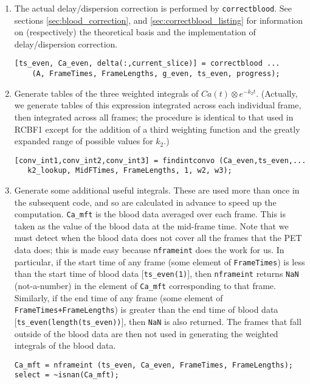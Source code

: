\documentclass[12pt]{article}
\def\code#1{{\tt #1}}
\begin{document}
\begin{enumerate}
\item The actual delay/dispersion correction is performed by
  \code{correctblood}.  See sections \ref{sec:blood_correction}, and
  \ref{sec:correctblood_listing} for information on (respectively) the
  theoretical basis and the implementation of delay/dispersion
  correction.
  \begin{verbatim}
[ts_even, Ca_even, delta(:,current_slice)] = correctblood ...
    (A, FrameTimes, FrameLengths, g_even, ts_even, progress);
  \end{verbatim}

\item Generate tables of the three weighted integrals of $Ca(t)
  \otimes e^{-k_{2}t}$.  (Actually, we generate tables of this
  expression integrated across each individual frame, then integrated
  across all frames; the procedure is identical to that used in RCBF1
  except for the addition of a third weighting function and the
  greatly expanded range of possible values for $k_2$.)
  \begin{verbatim}
[conv_int1,conv_int2,conv_int3] = findintconvo (Ca_even,ts_even,...
   k2_lookup, MidFTimes, FrameLengths, 1, w2, w3);
  \end{verbatim}

\item Generate some additional useful integrals.  These are used more
  than once in the subsequent code, and so are calculated in advance
  to speed up the computation.  \code{Ca\_mft} is the blood data
  averaged over each frame.  This is taken as the value of the blood
  data at the mid-frame time.  Note that we must detect when the blood
  data does not cover all the frames that the PET data does; this is
  made easy because \code{nframeint} does the work for us.  In
  particular, if the start time of any frame (some element of
  \code{FrameTimes}) is less than the start time of blood data
  [\code{ts\_even(1)}], then \code{nframeint} returns \code{NaN}
  (not-a-number) in the element of \code{Ca\_mft} corresponding to that
  frame.  Similarly, if the end time of any frame (some element of
  \code{FrameTimes+FrameLengths}) is greater than the end time of
  blood data [\code{ts\_even(length(ts\_even))}], then \code{NaN}
  is also returned.  The frames that fall outside of the blood data
  are then not used in generating the weighted integrals of the blood data.
\begin{verbatim}
Ca_mft = nframeint (ts_even, Ca_even, FrameTimes, FrameLengths);      
select = ~isnan(Ca_mft);


\end{verbatim}
\end{enumerate}
\end{document}

